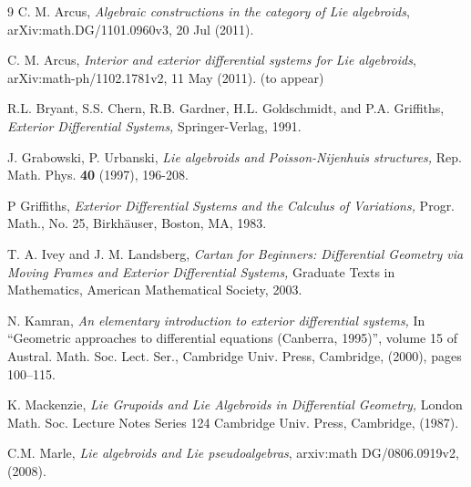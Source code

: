 \documentclass[11pt]{article}
\begin{document}





\begin{thebibliography}{9}
 C. M. Arcus, \emph{Algebraic constructions in the category of
Lie algebroids}, arXiv:math.DG/1101.0960v3, 20 Jul (2011).

 C. M. Arcus, \emph{Interior and exterior differential systems
for Lie algebroids}, arXiv:math-ph/1102.1781v2, 11 May (2011). (to appear)

 R.L. Bryant, S.S. Chern, R.B. Gardner, H.L. Goldschmidt, and
P.A. Griffiths, \emph{Exterior Differential Systems,} Springer-Verlag, 1991.

 J. Grabowski, P. Urbanski, \emph{Lie algebroids and
Poisson-Nijenhuis structures,} Rep. Math. Phys. \textbf{40} (1997), 196-208.

 P Griffiths, \emph{Exterior Differential Systems and the
Calculus of Variations,} Progr. Math., No. 25, Birkh\"{a}user, Boston, MA,
1983.

 T. A. Ivey and J. M. Landsberg, \emph{Cartan for Beginners:
Differential Geometry via Moving Frames and Exterior Differential Systems,}
Graduate Texts in Mathematics, American Mathematical Society, 2003.

 N. Kamran, \emph{An elementary introduction to exterior
differential systems,} In \textquotedblleft Geometric approaches to
differential equations (Canberra, 1995)\textquotedblright , volume 15 of
Austral. Math. Soc. Lect. Ser., Cambridge Univ. Press, Cambridge, (2000),
pages 100--115.

 K. Mackenzie, \emph{Lie Grupoids and Lie Algebroids in
Differential Geometry,} London Math. Soc. Lecture Notes Series 124 Cambridge
Univ. Press, Cambridge, (1987).

 C.M. Marle, \emph{Lie algebroids and Lie pseudoalgebras},
arxiv:math DG/0806.0919v2, (2008).
\end{thebibliography}

\bigskip

\bigskip
\end{document}
